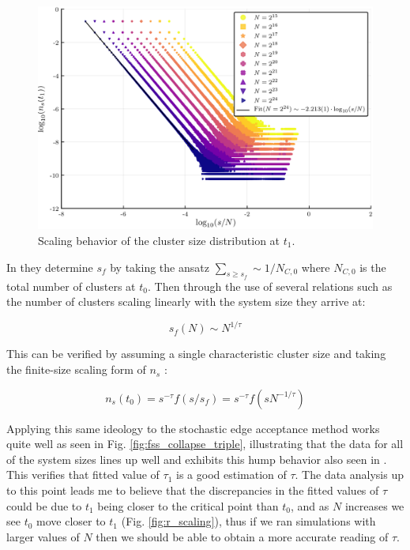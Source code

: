 \begin{figure}[H]
	\centering
	\includegraphics[width=350pt, clip]{images/n_s_t_1.png}
	\caption{Scaling behavior of the cluster size distribution at $t_1$.}
	\label{fig:n_s_t_1}
\end{figure}

In \cite{Lee_1} they determine $s_f$ by taking the ansatz $\sum_{s \ge s_f} \sim 1 / N_{C, 0}$ where $N_{C, 0}$ is the total number of clusters at $t_0$.
Then through the use of several relations such as the number of clusters scaling linearly with the system size they arrive at:

\begin{equation}
	s_f(N) \sim N^{1 / \tau}
\end{equation}

This can be verified by assuming a single characteristic cluster size and taking the finite-size scaling form of $n_s$ \cite{Lee_1}:

\begin{equation}
	n_s(t_0) = s^{-\tau} f(s / s_f) = s^{-\tau} f(s N^{-1 / \tau})
\end{equation}

Applying this same ideology to the stochastic edge acceptance method works quite well as seen in Fig. \ref{fig:fss_collapse_triple}, illustrating that the data for all of the system sizes lines up well and exhibits this hump behavior also seen in \cite{Lee_1}.
This verifies that fitted value of $\tau_1$ is a good estimation of $\tau$.
The data analysis up to this point leads me to believe that the discrepancies in the fitted values of $\tau$ could be due to $t_1$ being closer to the critical point than $t_0$, and as $N$ increases we see $t_0$ move closer to $t_1$ (Fig. \ref{fig:r_scaling}), thus if we ran simulations with larger values of $N$ then we should be able to obtain a more accurate reading of $\tau$.

